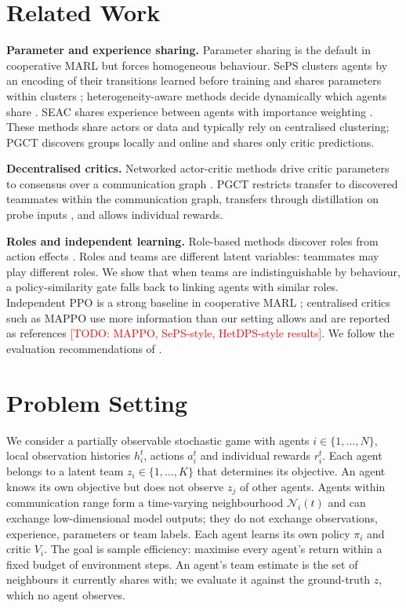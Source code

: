 \documentclass{article}
\newcommand{\todo}[1]{\textcolor{red}{[TODO: #1]}}
\newcommand{\ours}{PGCT}
\begin{document}
\section{Related Work}
\textbf{Parameter and experience sharing.} Parameter sharing is the default in cooperative MARL but forces
homogeneous behaviour. SePS clusters agents by an encoding of their transitions learned before training and shares
parameters within clusters \cite{christianos2021seps}; heterogeneity-aware methods decide dynamically which agents
share \cite{hu2025heterogeneity}. SEAC shares experience between agents with importance weighting
\cite{christianos2020seac}. These methods share actors or data and typically rely on centralised clustering;
\ours{} discovers groups locally and online and shares only critic predictions.

\textbf{Decentralised critics.} Networked actor-critic methods drive critic parameters to consensus over a
communication graph \cite{zhang2018networked}. \ours{} restricts transfer to discovered teammates within the
communication graph, transfers through distillation on probe inputs \cite{rusu2016policy}, and allows individual
rewards.

\textbf{Roles and independent learning.} Role-based methods discover roles from action effects
\cite{wang2021rode}. Roles and teams are different latent variables: teammates may play different roles. We show that
when teams are indistinguishable by behaviour, a policy-similarity gate falls back to linking agents with similar
roles. Independent PPO is a strong baseline in cooperative MARL \cite{schulman2017ppo,dewitt2020ippo}; centralised
critics such as MAPPO \cite{yu2022mappo} use more information than our setting allows and are reported as references
\todo{MAPPO, SePS-style, HetDPS-style results}. We follow the evaluation recommendations of \cite{agarwal2021precipice}.

\section{Problem Setting}
We consider a partially observable stochastic game with agents $i\in\{1,\dots,N\}$, local observation histories
$h_i^t$, actions $a_i^t$ and individual rewards $r_i^t$. Each agent belongs to a latent team $z_i\in\{1,\dots,K\}$
that determines its objective. An agent knows its own objective but does not observe $z_j$ of other agents. Agents
within communication range form a time-varying neighbourhood $\mathcal{N}_i(t)$ and can exchange low-dimensional
model outputs; they do not exchange observations, experience, parameters or team labels. Each agent learns its own
policy $\pi_i$ and critic $V_i$. The goal is sample efficiency: maximise every agent's return within a fixed budget of
environment steps. An agent's team estimate is the set of neighbours it currently shares with; we evaluate it against
the ground-truth $z$, which no agent observes.
\end{document}
